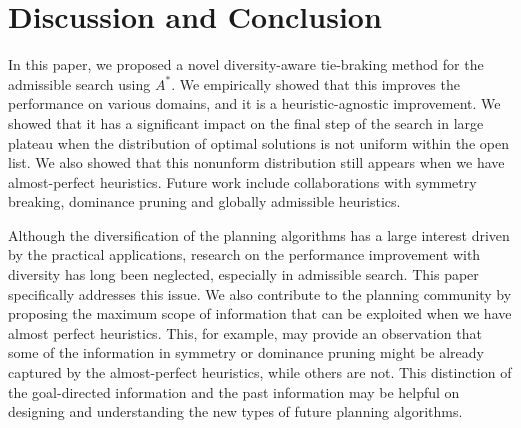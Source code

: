 \section{Discussion and Conclusion}

In this paper, we proposed a novel diversity-aware tie-braking method for the admissible search using $A^*$. We empirically showed that this improves the performance on various domains, and it is a heuristic-agnostic improvement. We showed that it has a significant impact on the final step of the search in large plateau when the distribution of optimal solutions is not uniform within the open list. We also showed that this nonunform distribution still appears when we have almost-perfect heuristics. Future work include collaborations with symmetry breaking, dominance pruning and globally admissible heuristics.

Although the diversification of the planning algorithms has a large interest driven by the practical applications, research on the performance improvement with diversity has long been neglected, especially in admissible search. This paper specifically addresses this issue. We also  contribute to the planning community by proposing the maximum scope of information that can be exploited when we have almost perfect heuristics. This, for example, may provide an observation that some of the information in symmetry or dominance pruning might be already captured by the almost-perfect heuristics, while others are not. This distinction of the goal-directed information and the past information may be helpful on designing and understanding the new types of future planning algorithms.


